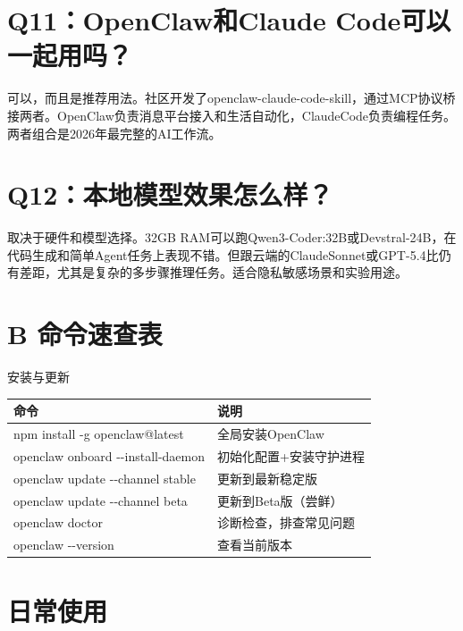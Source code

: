 \documentclass[
  10
]{article}
\newcounter{none} %
\begin{document}
\section{Q11：OpenClaw和Claude
Code可以一起用吗？}\label{q11openclawux548cclaude-codeux53efux4ee5ux4e00ux8d77ux7528ux5417}

可以，而且是推荐用法。社区开发了openclaw-claude-code-skill，通过MCP协议桥接两者。OpenClaw负责消息平台接入和生活自动化，ClaudeCode负责编程任务。两者组合是2026年最完整的AI工作流。

\section{Q12：本地模型效果怎么样？}\label{q12ux672cux5730ux6a21ux578bux6548ux679cux600eux4e48ux6837}

取决于硬件和模型选择。32GB
RAM可以跑Qwen3-Coder:32B或Devstral-24B，在代码生成和简单Agent任务上表现不错。但跟云端的ClaudeSonnet或GPT-5.4比仍有差距，尤其是复杂的多步骤推理任务。适合隐私敏感场景和实验用途。

\section{B 命令速查表}\label{b-ux547dux4ee4ux901fux67e5ux8868}

安装与更新

{\def\LTcaptype{none} %
\begin{longtable}[]{@{}|l|l|@{}}
\toprule\noalign{}
\endhead
\bottomrule\noalign{}
\endlastfoot
\hline
命令 & 说明 \\
\hline
npm install -g openclaw@latest & 全局安装OpenClaw \\
\hline
openclaw onboard -\/-install-daemon & 初始化配置+安装守护进程 \\
\hline
openclaw update -\/-channel stable & 更新到最新稳定版 \\
\hline
openclaw update -\/-channel beta & 更新到Beta版（尝鲜） \\
\hline
openclaw doctor & 诊断检查，排查常见问题 \\
\hline
openclaw -\/-version & 查看当前版本 \\
\hline
\end{longtable}
}

\section{日常使用}\label{ux65e5ux5e38ux4f7fux7528}
\end{document}
